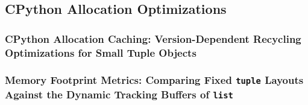 \subsection{CPython Allocation Optimizations}
\subsubsection{CPython Allocation Caching: Version-Dependent Recycling Optimizations for Small Tuple Objects}
\subsubsection{Memory Footprint Metrics: Comparing Fixed \texttt{tuple} Layouts Against the Dynamic Tracking Buffers of \texttt{list}}
